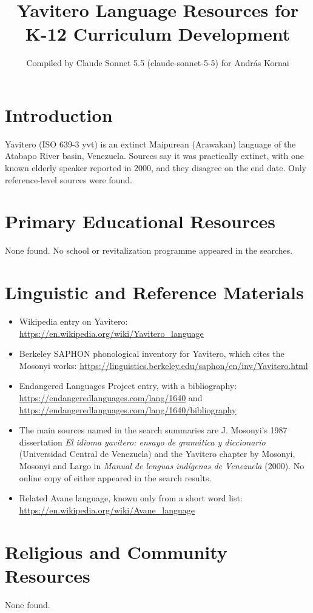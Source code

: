 \documentclass[12pt]{article}
\title{Yavitero Language Resources for K-12 Curriculum Development}
\author{Compiled by Claude Sonnet 5.5 (claude-sonnet-5-5) for Andr\'as Kornai}
\date{}
\begin{document}
\maketitle

\section{Introduction}
Yavitero (ISO 639-3 yvt) is an extinct Maipurean (Arawakan) language of the Atabapo River basin, Venezuela. Sources say it was practically extinct, with one known elderly speaker reported in 2000, and they disagree on the end date. Only reference-level sources were found.

\section{Primary Educational Resources}
None found. No school or revitalization programme appeared in the searches.

\section{Linguistic and Reference Materials}
\begin{itemize}
\item Wikipedia entry on Yavitero: \url{https://en.wikipedia.org/wiki/Yavitero_language}
\item Berkeley SAPHON phonological inventory for Yavitero, which cites the Mosonyi works: \url{https://linguistics.berkeley.edu/saphon/en/inv/Yavitero.html}
\item Endangered Languages Project entry, with a bibliography: \url{https://endangeredlanguages.com/lang/1640} and \url{https://endangeredlanguages.com/lang/1640/bibliography}
\item The main sources named in the search summaries are J. Mosonyi's 1987 dissertation \emph{El idioma yavitero: ensayo de gramática y diccionario} (Universidad Central de Venezuela) and the Yavitero chapter by Mosonyi, Mosonyi and Largo in \emph{Manual de lenguas indígenas de Venezuela} (2000). No online copy of either appeared in the search results.
\item Related Avane language, known only from a short word list: \url{https://en.wikipedia.org/wiki/Avane_language}
\end{itemize}

\section{Religious and Community Resources}
None found.
\end{document}
